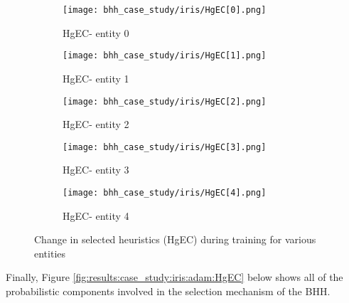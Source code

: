 \begin{figure}[htbp]
	\begin{subfigure}{0.5\textwidth}
		\centering
		\texttt{[image: bhh\_case\_study/iris/HgEC[0].png]}
		\caption{HgEC\rbrack - entity 0}
		\label{fig:results:case_study:iris:HgEC:0}
	\end{subfigure}
	\begin{subfigure}{0.5\textwidth}
		\centering
		\texttt{[image: bhh\_case\_study/iris/HgEC[1].png]}
		\caption{HgEC\rbrack - entity 1}
		\label{fig:results:case_study:iris:HgEC:1}
	\end{subfigure}
	\par\bigskip
	\begin{subfigure}{0.5\textwidth}
		\centering
		\texttt{[image: bhh\_case\_study/iris/HgEC[2].png]}
		\caption{HgEC\rbrack - entity 2}
		\label{fig:results:case_study:iris:HgEC:2}
	\end{subfigure}
	\begin{subfigure}{0.5\textwidth}
		\centering
		\texttt{[image: bhh\_case\_study/iris/HgEC[3].png]}
		\caption{HgEC\rbrack - entity 3}
		\label{fig:results:case_study:iris:HgEC:3}
	\end{subfigure}
	\par\bigskip
	\begin{subfigure}{\textwidth}
		\centering
		\texttt{[image: bhh\_case\_study/iris/HgEC[4].png]}
		\caption{HgEC\rbrack - entity 4}
		\label{fig:results:case_study:iris:HgEC:4}
	\end{subfigure}
	\par\bigskip
	\caption{Change in selected heuristics (HgEC) during training for various entities}
	\label{fig:results:case_study:iris:HgEC}
\end{figure}

Finally, Figure \ref{fig:results:case_study:iris:adam:HgEC} below shows all of the probabilistic components involved in the selection mechanism of the \Ac{BHH}.

